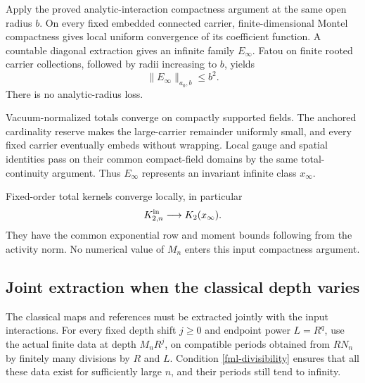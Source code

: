 Apply the proved analytic-interaction compactness argument
at the same open radius \(b\). On every fixed embedded
connected carrier, finite-dimensional Montel compactness
gives local uniform convergence of its coefficient function.
A countable diagonal extraction gives an infinite family
\(E_\infty\). Fatou on finite rooted carrier collections,
followed by radii increasing to \(b\), yields
\begin{equation}
                         \|E_\infty\|_{a_0,b}\le b^2.
 \label{fml-limit-norm}
\end{equation}
There is no analytic-radius loss.

Vacuum-normalized totals converge on compactly supported
fields. The anchored cardinality reserve makes the
large-carrier remainder uniformly small, and every fixed
carrier eventually embeds without wrapping. Local gauge
and spatial identities pass on their common compact-field
domains by the same total-continuity argument. Thus
\(E_\infty\) represents an invariant infinite class
\(x_\infty\).

Fixed-order total kernels converge locally, in particular
\begin{equation}
                K_{2,n}^{\rm in}\longrightarrow K_2(x_\infty).
 \label{fml-input-kernel-limit}
\end{equation}
They have the common exponential row and moment bounds
following from the activity norm. No numerical value of
\(M_n\) enters this input compactness argument.

\subsection{Joint extraction when the classical depth varies}
\label{fml-varying-depth-section}

The classical maps and references must be extracted jointly
with the input interactions. For every fixed depth shift
\(j\ge0\) and endpoint power \(L=R^q\), use the actual finite
data at depth \(M_nR^j\), on compatible periods obtained
from \(RN_n\) by finitely many divisions by \(R\) and \(L\).
Condition \eqref{fml-divisibility} ensures that all these
data exist for sufficiently large \(n\), and their periods
still tend to infinity.

